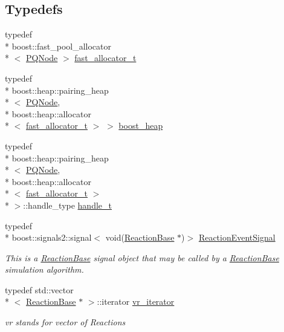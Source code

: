 \subsection*{Typedefs}
\begin{DoxyCompactItemize}
\item 
typedef \\*
boost\-::fast\-\_\-pool\-\_\-allocator\\*
$<$ \hyperlink{classchem_1_1PQNode}{P\-Q\-Node} $>$ \hyperlink{namespacechem_a98412a4cd9bafe9f3edd66b3a68327a3}{fast\-\_\-allocator\-\_\-t}
\item 
typedef \\*
boost\-::heap\-::pairing\-\_\-heap\\*
$<$ \hyperlink{classchem_1_1PQNode}{P\-Q\-Node}, \\*
boost\-::heap\-::allocator\\*
$<$ \hyperlink{namespacechem_a98412a4cd9bafe9f3edd66b3a68327a3}{fast\-\_\-allocator\-\_\-t} $>$ $>$ \hyperlink{namespacechem_ad3c7e19583b71f442e2d969972ed21f9}{boost\-\_\-heap}
\item 
typedef \\*
boost\-::heap\-::pairing\-\_\-heap\\*
$<$ \hyperlink{classchem_1_1PQNode}{P\-Q\-Node}, \\*
boost\-::heap\-::allocator\\*
$<$ \hyperlink{namespacechem_a98412a4cd9bafe9f3edd66b3a68327a3}{fast\-\_\-allocator\-\_\-t} $>$\\*
 $>$\-::handle\-\_\-type \hyperlink{namespacechem_abf1718e53f56f85003559d20e531a1a4}{handle\-\_\-t}
\item 
typedef \\*
boost\-::signals2\-::signal$<$ void(\hyperlink{classchem_1_1ReactionBase}{Reaction\-Base} $\ast$)$>$ \hyperlink{namespacechem_a40bfcc5c8ae87e2713c68fae68215991}{Reaction\-Event\-Signal}
\begin{DoxyCompactList}\small\item\em This is a \hyperlink{classchem_1_1ReactionBase}{Reaction\-Base} signal object that may be called by a \hyperlink{classchem_1_1ReactionBase}{Reaction\-Base} simulation algorithm. \end{DoxyCompactList}\item 
typedef std\-::vector\\*
$<$ \hyperlink{classchem_1_1ReactionBase}{Reaction\-Base} $\ast$ $>$\-::iterator \hyperlink{namespacechem_a0decff3bb0047ac3a45bc12163f063e4}{vr\-\_\-iterator}
\begin{DoxyCompactList}\small\item\em vr stands for vector of Reactions \end{DoxyCompactList}\item 

\end{DoxyCompactItemize}
